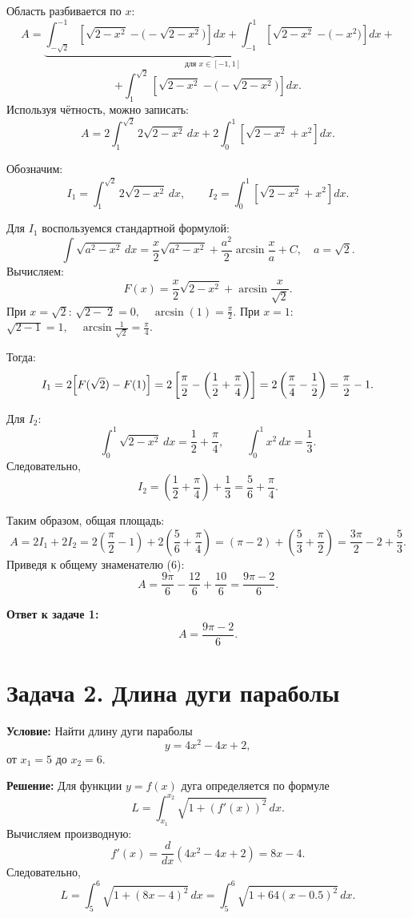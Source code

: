 \documentclass[12pt,a4paper]{article}
\begin{document}
Область разбивается по \(x\):
\[
A = \underbrace{\int_{-\sqrt{2}}^{-1} \left[\sqrt{2-x^2}-\bigl(-\sqrt{2-x^2}\bigr)\right]dx + \int_{-1}^{1} \left[\sqrt{2-x^2} - \bigl(-x^2\bigr)\right]dx}_{\text{для } x\in[-1,1]} +
\]
\[
+ \int_{1}^{\sqrt{2}} \left[\sqrt{2-x^2}-\bigl(-\sqrt{2-x^2}\bigr)\right]dx.
\]
Используя чётность, можно записать:
\[
A = 2\int_{1}^{\sqrt{2}} 2\sqrt{2-x^2}\,dx + 2\int_{0}^{1} \left[\sqrt{2-x^2} + x^2\right]dx.
\]

Обозначим:
\[
I_1 = \int_{1}^{\sqrt{2}} 2\sqrt{2-x^2}\,dx,\qquad I_2 = \int_{0}^{1} \left[\sqrt{2-x^2}+x^2\right]dx.
\]

Для \(I_1\) воспользуемся стандартной формулой:
\[
\int \sqrt{a^2-x^2}\,dx = \frac{x}{2}\sqrt{a^2-x^2}+\frac{a^2}{2}\arcsin\frac{x}{a}+C,\quad a=\sqrt{2}.
\]
Вычисляем:
\[
F(x)= \frac{x}{2}\sqrt{2-x^2} + \arcsin\frac{x}{\sqrt{2}}.
\]
При \(x=\sqrt{2}\): \(\sqrt{2-\;2}=0,\quad \arcsin(1)=\frac{\pi}{2}\).  
При \(x=1\): \(\sqrt{2-1}=1,\quad \arcsin\frac{1}{\sqrt{2}}=\frac{\pi}{4}\).  

Тогда:
\[
I_1=2\Bigl[F(\sqrt{2})-F(1)\Bigr]=2\left[\frac{\pi}{2}-\left(\frac{1}{2}+\frac{\pi}{4}\right)\right]
=2\left(\frac{\pi}{4}-\frac{1}{2}\right)
=\frac{\pi}{2}-1.
\]

Для \(I_2\):
\[
\int_{0}^{1}\sqrt{2-x^2}\,dx = \frac{1}{2}+\frac{\pi}{4},\qquad \int_{0}^{1}x^2\,dx = \frac{1}{3}.
\]
Следовательно,
\[
I_2 = \left(\frac{1}{2}+\frac{\pi}{4}\right)+\frac{1}{3} = \frac{5}{6}+\frac{\pi}{4}.
\]

Таким образом, общая площадь:
\[
A=2I_1+2I_2 = 2\left(\frac{\pi}{2}-1\right)+2\left(\frac{5}{6}+\frac{\pi}{4}\right)
=\left(\pi-2\right)+\left(\frac{5}{3}+\frac{\pi}{2}\right)
=\frac{3\pi}{2}-2+\frac{5}{3}.
\]
Приведя к общему знаменателю (6):
\[
A=\frac{9\pi}{6}-\frac{12}{6}+\frac{10}{6}=\frac{9\pi-2}{6}.
\]

\textbf{Ответ к задаче 1:} 
\[
A = \frac{9\pi-2}{6}.
\]

\section*{Задача 2. Длина дуги параболы}
\textbf{Условие:} Найти длину дуги параболы
\[
y=4x^2-4x+2,
\]
от \(x_1=5\) до \(x_2=6\).

\textbf{Решение:} Для функции \(y=f(x)\) дуга определяется по формуле
\[
L=\int_{x_1}^{x_2}\sqrt{1+\left(f'(x)\right)^2}\,dx.
\]
Вычисляем производную:
\[
f'(x)=\frac{d}{dx}(4x^2-4x+2)=8x-4.
\]
Следовательно,
\[
L=\int_{5}^{6}\sqrt{1+(8x-4)^2}\,dx
=\int_{5}^{6}\sqrt{1+64(x-0.5)^2}\,dx.
\]
\end{document}
